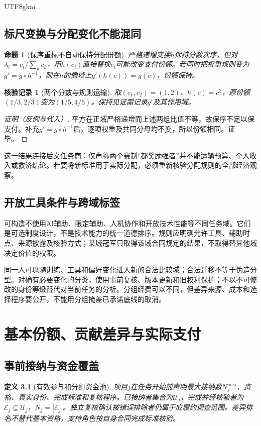 \documentclass[12pt,a4paper,openany]{report}
\newtheorem{definition}{定义}[chapter]
\newtheorem{proposition}{命题}[chapter]
\newtheorem{Certificate}{核验记录}[chapter]
\newcommand{\EEset}{\mathcal E}
\begin{document}
\begin{CJK*}{UTF8}{gkai}
\section{标尺变换与分配变化不能混同}
\begin{proposition}[保序重标不自动保持分配份额]
\label{prop:rescale}
严格递增变换$h$保持分数次序，但对$\lambda_i=c_i/\sum_kc_k$，用$h(c_i)$直接替换$c_i$可能改变支付份额。若同时把权重规则变为$g'=g\circ h^{-1}$，则在$h$的像域上$g'(h(c))=g(c)$，份额保持。
\end{proposition}
\begin{Certificate}[两个分数与规则运输]
取$(c_1,c_2)=(1,2)$、$h(c)=c^2$，原份额$(1/3,2/3)$变为$(1/5,4/5)$。保持见证需记录$g'$及其作用域。
\end{Certificate}
\begin{proof}[证明（反例与代入）]
平方在正域严格递增而上述两组比值不等，故保序不足以保支付。补充$g'=g\circ h^{-1}$后，逐项权重及共同分母均不变，所以份额相同。证毕。
\end{proof}
这一结果连接后文任务商：仅声称两个赛制“都奖励强者”并不能运输预算、个人收入或救济结论。若要将新标准用于实际分配，必须重新核验分配规则的全部经济观察。

\section{开放工具条件与跨域标签}
可构造不使用AI辅助、限定辅助、人机协作和开放技术性能等不同任务域。它们是可选制度设计，不是技术能力的统一道德排序。规则应明确允许工具、辅助时点、来源披露及核验方式；某域冠军只取得该域合同规定的结果，不取得替其他域决定价值的权限。

同一人可以随训练、工具和偏好变化进入新的合法比较域；合法迁移不等于伪造分型。对确有必要变化的分类，使用事前复核、版本更新和旧权利保护；不以不可修改的身份等级替代对当前任务的分析。分组经费可以不同，但差异来源、成本和选择程序要公开，不能用分组掩盖已承诺底线的取消。

\chapter{基本份额、贡献差异与实际支付}
\label{chap:distribution}
\section{事前接纳与资金覆盖}
\begin{definition}[有效参与和分组资金池]
\label{def:participation}
项目$j$在任务开始前声明最大接纳数$N_j^{\max}$、资格、真实身份、完成标准和复核程序。已接纳者集合为$\mathcal U_j$，完成并经核验者为$\EEset_j\subseteq\mathcal U_j$，$N_j=|\EEset_j|$。独立复核确认被错误排除者仍属于应履约调查范围。差异排名不替代基本资格，支持角色按自身合同完成标准核验。


\end{definition}
\end{CJK*}
\end{document}
